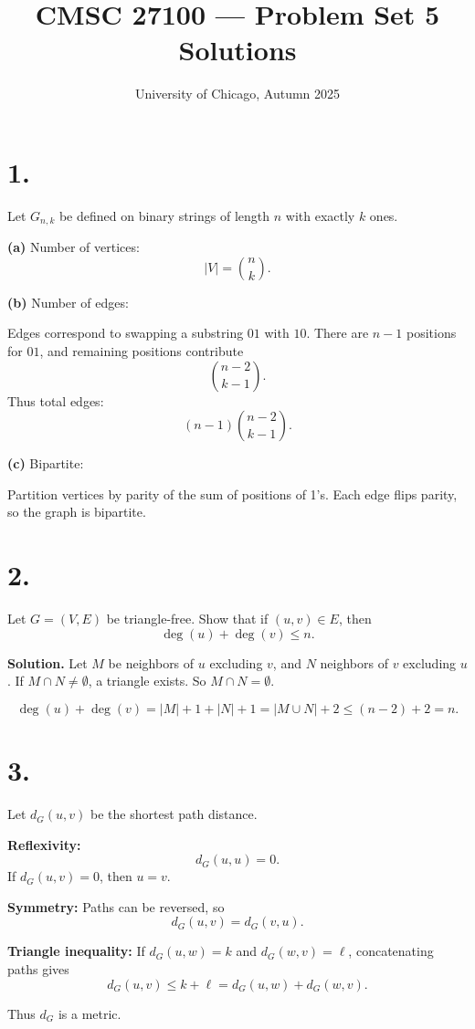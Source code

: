 \documentclass[11pt]{article}
\title{CMSC 27100 --- Problem Set 5 Solutions}
\date{University of Chicago, Autumn 2025}
\begin{document}
\maketitle

\section*{1.}
Let $G_{n,k}$ be defined on binary strings of length $n$ with exactly $k$ ones.

\textbf{(a)} Number of vertices:
\[
|V| = \binom{n}{k}.
\]

\textbf{(b)} Number of edges:

Edges correspond to swapping a substring $01$ with $10$.
There are $n-1$ positions for $01$, and remaining positions contribute
\[
\binom{n-2}{k-1}.
\]
Thus total edges:
\[
(n-1)\binom{n-2}{k-1}.
\]

\textbf{(c)} Bipartite:

Partition vertices by parity of the sum of positions of 1's.
Each edge flips parity, so the graph is bipartite.

\section*{2.}
Let $G=(V,E)$ be triangle-free. Show that if $(u,v)\in E$, then
\[
\deg(u) + \deg(v) \le n.
\]

\textbf{Solution.}
Let $M$ be neighbors of $u$ excluding $v$, and $N$ neighbors of $v$ excluding $u$.
If $M \cap N \neq \emptyset$, a triangle exists. So $M \cap N = \emptyset$.

\[
\deg(u) + \deg(v) = |M| + 1 + |N| + 1 = |M \cup N| + 2 \le (n-2)+2 = n.
\]

\section*{3.}
Let $d_G(u,v)$ be the shortest path distance.

\textbf{Reflexivity:}
\[
d_G(u,u)=0.
\]
If $d_G(u,v)=0$, then $u=v$.

\textbf{Symmetry:}
Paths can be reversed, so
\[
d_G(u,v)=d_G(v,u).
\]

\textbf{Triangle inequality:}
If $d_G(u,w)=k$ and $d_G(w,v)=\ell$, concatenating paths gives
\[
d_G(u,v) \le k+\ell = d_G(u,w)+d_G(w,v).
\]

Thus $d_G$ is a metric.
\end{document}
